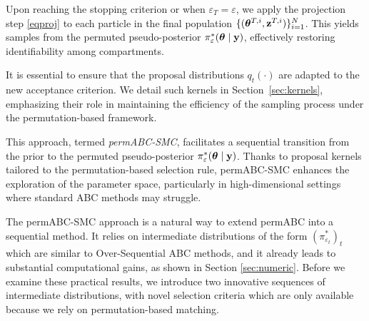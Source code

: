 Upon reaching the stopping criterion or when \( \varepsilon_T = \varepsilon \), we apply the projection step \eqref{eqproj} to each particle in the final population \( \{(\boldsymbol{\theta}^{T,i}, \mathbf{z}^{T,i})\}_{i=1}^N \). This yields samples from the permuted pseudo-posterior \( \pi_\varepsilon^*(\boldsymbol{\theta} \mid \mathbf{y}) \), effectively restoring identifiability among compartments.

It is essential to ensure that the proposal distributions \( q_t(\cdot) \) are adapted to the new acceptance criterion. We detail such kernels in Section~\ref{sec:kernels}, emphasizing their role in maintaining the efficiency of the sampling process under the permutation-based framework.

This approach, termed \emph{permABC-SMC}, facilitates a sequential transition from the prior to the permuted pseudo-posterior \( \pi^*_\varepsilon(\boldsymbol{\theta} \mid \mathbf{y}) \). Thanks to proposal kernels tailored to the permutation-based selection rule, permABC-SMC enhances the exploration of the parameter space, particularly in high-dimensional settings where standard ABC methods may struggle.

The permABC-SMC approach is a natural way to extend permABC into a sequential method. It relies on intermediate distributions of the form $(\pi^*_{\varepsilon_t})_t$ which are similar to Over-Sequential ABC methods, and it already leads to substantial computational gains, as shown in Section \ref{sec:numeric}. Before we examine these practical results, we introduce two innovative sequences of intermediate distributions, with novel selection criteria which are only available because we rely on permutation-based matching.

